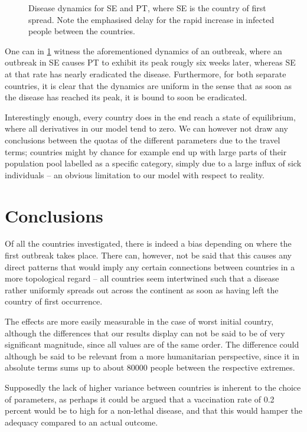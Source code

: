 \documentclass[a4paper,12pt]{article}
\theoremstyle{plain}
\theoremstyle{definition}
\begin{document}
   \begin{figure}[H]
      \centering
      \resizebox{.6\textwidth}{!}{}
      \caption{Disease dynamics for SE and PT, where SE is the country of first
      spread. Note the emphasised delay for the rapid increase in infected
      people between the countries. }
      \label{fig:dyn}            
   \end{figure}

   One can in \cref{fig:dyn} witness the aforementioned dynamics of an outbreak,
   where an outbreak in SE causes PT to exhibit its peak rougly six weeks
   later, whereas SE at that rate has nearly eradicated the disease.
   Furthermore, for both separate countries, it is clear that the dynamics are
   uniform in the sense that as soon as the disease has reached its peak, it is
   bound to soon be eradicated.  

   Interestingly enough, every country does in the end reach a state of
   equilibrium, where all derivatives in our model tend to zero. We can however
   not draw any conclusions between the quotas of the different parameters due
   to the travel terms; countries might by chance for example end up with large parts of
   their population pool labelled as a specific category, simply due to a large
   influx of sick individuals -- an obvious limitation to our model with respect
   to reality.  

\section*{Conclusions}
   Of all the countries investigated, there is indeed a bias depending on where
   the first outbreak takes place. There can, however, not be said that this
   causes any direct patterns that would imply any certain connections between
   countries in a more topological regard -- all countries seem intertwined
   such that a disease rather uniformly spreads out across the continent as soon
   as having left the country of first occurrence. 

   The effects are more easily measurable in the case of worst initial country, 
   although the differences that our
   results display can not be said to be of very significant magnitude, since
   all values are of the same order. The difference could although be said to be
   relevant from a more humanitarian perspective, since it in absolute terms sums 
   up to about 80000 people between the respective extremes.
   
   Supposedly the lack of higher variance between countries  is inherent to the 
   choice of parameters, as perhaps it could be
   argued that a vaccination rate of 0.2 percent would be to high for a
   non-lethal disease, and that this would hamper the adequacy compared to an
   actual outcome. 
\end{document}
